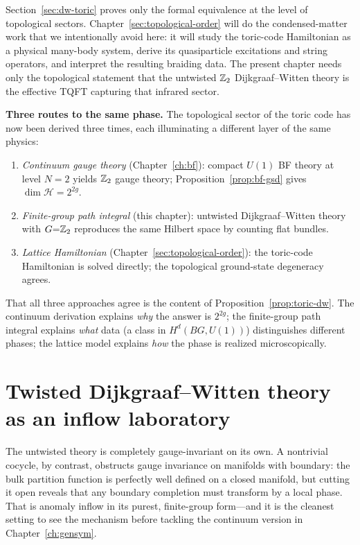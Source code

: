 \begin{remark}\label{rem:dw-toric-scope}
Section~\ref{sec:dw-toric} proves only the formal equivalence at the level of topological sectors. Chapter~\ref{sec:topological-order} will do the condensed-matter work that we intentionally avoid here: it will study the toric-code Hamiltonian as a physical many-body system, derive its quasiparticle excitations and string operators, and interpret the resulting braiding data. The present chapter needs only the topological statement that the untwisted $\mathbb{Z}_2$ Dijkgraaf--Witten theory is the effective TQFT capturing that infrared sector.
\end{remark}

\medskip

\noindent\textbf{Three routes to the same phase.}  The topological sector of the toric code has now been derived three times, each illuminating a different layer of the same physics:
\begin{enumerate}
\item \emph{Continuum gauge theory} (Chapter~\ref{ch:bf}): compact $U(1)$ BF theory at level $N{=}2$ yields $\mathbb{Z}_2$ gauge theory; Proposition~\ref{prop:bf-gsd} gives $\dim\mathcal{H}=2^{2g}$.
\item \emph{Finite-group path integral} (this chapter): untwisted Dijkgraaf--Witten theory with $G{=}\mathbb{Z}_2$ reproduces the same Hilbert space by counting flat bundles.
\item \emph{Lattice Hamiltonian} (Chapter~\ref{sec:topological-order}): the toric-code Hamiltonian is solved directly; the topological ground-state degeneracy agrees.
\end{enumerate}
That all three approaches agree is the content of Proposition~\ref{prop:toric-dw}. The continuum derivation explains \emph{why} the answer is $2^{2g}$; the finite-group path integral explains \emph{what} data (a class in $H^d(BG,U(1))$) distinguishes different phases; the lattice model explains \emph{how} the phase is realized microscopically.

\section{Twisted Dijkgraaf--Witten theory as an inflow laboratory}\label{sec:dw-inflow}

The untwisted theory is completely gauge-invariant on its own.  A nontrivial cocycle, by contrast, obstructs gauge invariance on manifolds with boundary: the bulk partition function is perfectly well defined on a closed manifold, but cutting it open reveals that any boundary completion must transform by a local phase.  That is anomaly inflow in its purest, finite-group form---and it is the cleanest setting to see the mechanism before tackling the continuum version in Chapter~\ref{ch:gensym}.

